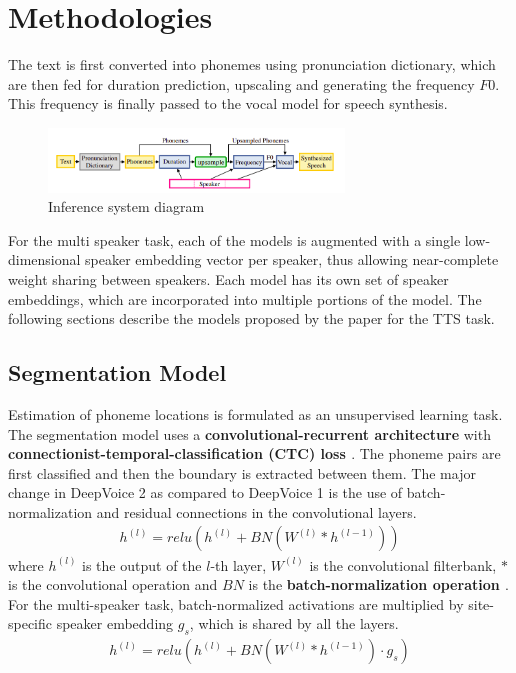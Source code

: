 \documentclass[twosided]{article}
\begin{document}
\section*{Methodologies}
The text is first converted into phonemes using pronunciation dictionary, which are then fed for duration prediction, upscaling and generating the frequency $F0$. This frequency is finally passed to the vocal model for speech synthesis. 
    \begin{figure}[h]
        \centering
        \includegraphics[width=0.7\textwidth]{images/Figure1.png}
        \caption{Inference system diagram}
        \label{fig:figure1}
    \end{figure}

For the multi speaker task, each of the models is augmented with a single low-dimensional speaker embedding vector per speaker, thus allowing near-complete weight sharing between speakers. Each model has its own set of speaker embeddings, which are incorporated into multiple portions of the model. The following sections describe the models proposed by the paper for the TTS task.

\subsection*{Segmentation Model}
Estimation of phoneme locations is formulated as an unsupervised learning task. The segmentation model uses a \textbf{convolutional-recurrent architecture} with \textbf{connectionist-temporal-classification (CTC) loss \cite{CTCLoss}}. The phoneme pairs are first classified and then the boundary is extracted between them. The major change in DeepVoice 2 as compared to DeepVoice 1 is the use of batch-normalization and residual connections in the convolutional layers.
    \begin{align*}
	    h^{(l)} = relu(h^{(l)} + BN(W^{(l)} * h^{(l-1)}))
	\end{align*}
where $h^{(l)}$ is the output of the $l$-th layer, $W^{(l)}$ is the convolutional filterbank, $*$ is the convolutional operation and $BN$ is the \textbf{batch-normalization operation \cite{BatchNorm}}.\\
For the multi-speaker task, batch-normalized activations are multiplied by site-specific speaker embedding $g_s$, which is shared by all the layers.
    \begin{align*}
	    h^{(l)} = relu(h^{(l)} + BN(W^{(l)} * h^{(l-1)}) \cdot g_s)
	\end{align*}
\end{document}
